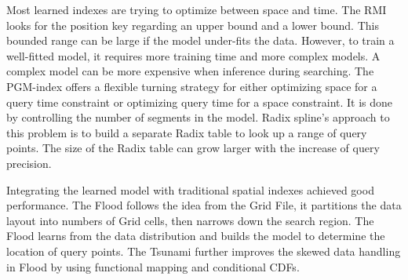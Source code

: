 Most learned indexes are trying to optimize between space and time. The RMI looks for the position key regarding an upper bound and a lower bound. This bounded range can be large if the model under-fits the data. However, to train a well-fitted model, it requires more training time and more complex models. A complex model can be more expensive when inference during searching.  The PGM-index offers a flexible turning strategy for either optimizing space for a query time constraint or optimizing query time for a space constraint. It is done by controlling the number of segments in the model. Radix spline’s approach to this problem is to build a separate Radix table to look up a range of query points. The size of the Radix table can grow larger with the increase of query precision. 

Integrating the learned model with traditional spatial indexes achieved good performance. The Flood follows the idea from the Grid File, it partitions the data layout into numbers of Grid cells, then narrows down the search region. The Flood learns from the data distribution and builds the model to determine the location of query points. The Tsunami further improves the skewed data handling in Flood by using functional mapping and conditional CDFs. 
